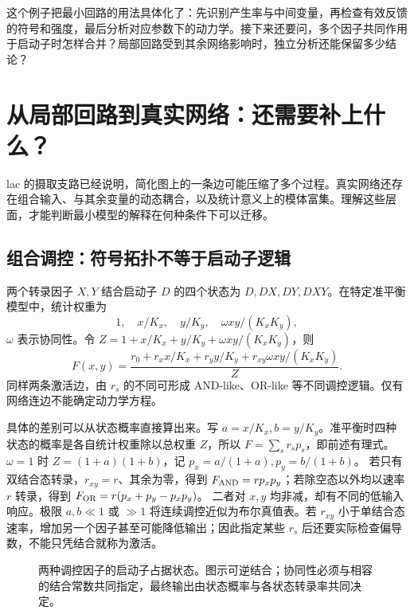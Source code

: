 \documentclass[11pt,a4paper,UTF8,fontset=fandol]{ctexart}
\begin{document}
这个例子把最小回路的用法具体化了：先识别产生率与中间变量，再检查有效反馈的符号和强度，最后分析对应参数下的动力学。接下来还要问，多个因子共同作用于启动子时怎样合并？局部回路受到其余网络影响时，独立分析还能保留多少结论？

\section{从局部回路到真实网络：还需要补上什么？}
lac 的摄取支路已经说明，简化图上的一条边可能压缩了多个过程。真实网络还存在组合输入、与其余变量的动态耦合，以及统计意义上的模体富集。理解这些层面，才能判断最小模型的解释在何种条件下可以迁移。
\subsection{组合调控：符号拓扑不等于启动子逻辑}
两个转录因子 $X,Y$ 结合启动子 $D$ 的四个状态为 $D,DX,DY,DXY$。在特定准平衡模型中，统计权重为
\begin{equation}1,\quad x/K_x,\quad y/K_y,\quad\omega xy/(K_xK_y),\end{equation}
$\omega$ 表示协同性。令 $Z=1+x/K_x+y/K_y+\omega xy/(K_xK_y)$，则
\begin{equation}F(x,y)=\frac{r_0+r_xx/K_x+r_yy/K_y+r_{xy}\omega xy/(K_xK_y)}{Z}.\end{equation}
同样两条激活边，由 $r_s$ 的不同可形成 AND-like、OR-like 等不同调控逻辑。仅有网络连边不能确定动力学方程。

具体的差别可以从状态概率直接算出来。写 $a=x/K_x,b=y/K_y$。准平衡时四种状态的概率是各自统计权重除以总权重 $Z$，所以 $F=\sum_s r_s p_s$，即前述有理式。$\omega=1$ 时 $Z=(1+a)(1+b)$，记 $p_x=a/(1+a),p_y=b/(1+b)$。
若只有双结合态转录，$r_{xy}=r$、其余为零，得到
$F_{\rm AND}=rp_xp_y$；若除空态以外均以速率 $r$ 转录，得到
$F_{\rm OR}=r(p_x+p_y-p_xp_y)$。
二者对 $x,y$ 均非减，却有不同的低输入响应。极限 $a,b\ll1$ 或 $\gg1$ 将连续调控近似为布尔真值表。若 $r_{xy}$ 小于单结合态速率，增加另一个因子甚至可能降低输出；因此指定某些 $r_s$ 后还要实际检查偏导数，不能只凭结合就称为激活。
\begin{figure}[H]\centering
{}
\caption{两种调控因子的启动子占据状态。图示可逆结合；协同性必须与相容的结合常数共同指定，最终输出由状态概率与各状态转录率共同决定。}
\end{figure}
\end{document}
